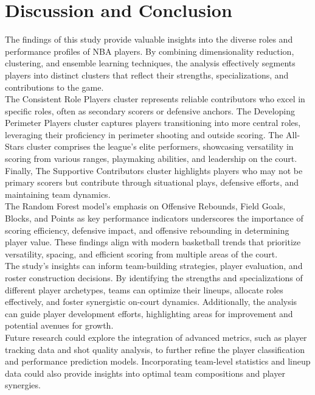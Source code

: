 \documentclass[fleqn,10pt]{SelfArx} %
\begin{document}
\section*{Discussion and Conclusion}
The findings of this study provide valuable insights into the diverse roles and performance profiles of NBA players. By combining dimensionality reduction, clustering, and ensemble learning techniques, the analysis effectively segments players into distinct clusters that reflect their strengths, specializations, and contributions to the game.\\
The Consistent Role Players cluster represents reliable contributors who excel in specific roles, often as secondary scorers or defensive anchors. The Developing Perimeter Players cluster captures players transitioning into more central roles, leveraging their proficiency in perimeter shooting and outside scoring. The All-Stars cluster comprises the league's elite performers, showcasing versatility in scoring from various ranges, playmaking abilities, and leadership on the court. Finally, The Supportive Contributors cluster highlights players who may not be primary scorers but contribute through situational plays, defensive efforts, and maintaining team dynamics.\\
The Random Forest model's emphasis on Offensive Rebounds, Field Goals, Blocks, and Points as key performance indicators underscores the importance of scoring efficiency, defensive impact, and offensive rebounding in determining player value. These findings align with modern basketball trends that prioritize versatility, spacing, and efficient scoring from multiple areas of the court.\\
The study's insights can inform team-building strategies, player evaluation, and roster construction decisions. By identifying the strengths and specializations of different player archetypes, teams can optimize their lineups, allocate roles effectively, and foster synergistic on-court dynamics. Additionally, the analysis can guide player development efforts, highlighting areas for improvement and potential avenues for growth.\\
Future research could explore the integration of advanced metrics, such as player tracking data and shot quality analysis, to further refine the player classification and performance prediction models. Incorporating team-level statistics and lineup data could also provide insights into optimal team compositions and player synergies.\\
\end{document}
